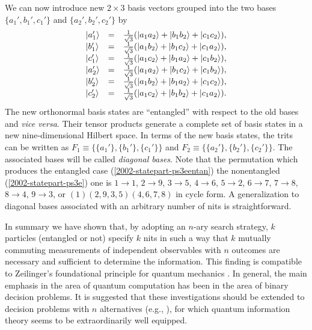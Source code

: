 We can now introduce new $2\times 3$  basis vectors  grouped into the two bases
$\{a_1',b_1',c_1'\}$
and
$\{a_2',b_2',c_2'\}$ by
\begin{equation}
\begin{array}{llll}
\vert a_1'  \rangle &=&{1\over \sqrt{3}}
   (\vert a_1a_2\rangle +  \vert b_1b_2\rangle  + \vert c_1c_2\rangle )
,\\
\vert b_1'  \rangle &=&{1\over \sqrt{3}}
   (\vert a_1b_2\rangle +  \vert b_1c_2\rangle  + \vert c_1a_2\rangle )
,\\
\vert c_1'  \rangle &=&{1\over \sqrt{3}}
   (\vert a_1c_2\rangle +  \vert b_1a_2\rangle  + \vert c_1b_2\rangle )
,\\
\vert a_2'  \rangle &=&{1\over \sqrt{3}}
   (\vert a_1a_2\rangle +  \vert b_1c_2\rangle  + \vert c_1b_2\rangle )
,\\
\vert b_2'  \rangle &=&{1\over \sqrt{3}}
   (\vert a_1b_2\rangle +  \vert b_1a_2\rangle  + \vert c_1c_2\rangle )
,\\
\vert c_2'  \rangle &=&{1\over \sqrt{3}}
   (\vert a_1c_2\rangle +  \vert b_1b_2\rangle  + \vert c_1a_2\rangle )
.
\end{array}
\label{2002-statepart-notb}
\end{equation}
The new orthonormal basis states are ``entangled'' with respect to the old bases
and {\em vice versa}.
Their tensor products generate a complete set of basis states in a new
nine-dimensional Hilbert space.
In terms of the new basis states, the trits can be written as
$F_1\equiv \{\{a_1'\},\{b_1'\},\{c_1'\}\}$
and
$F_2\equiv \{\{a_2'\},\{b_2'\},\{c_2'\}\}$.
The associated bases will be called {\em diagonal bases}.
Note that the permutation which produces the entangled case
(\ref{2002-statepart-ps3eentan})
the nonentangled
(\ref{2002-statepart-ps3e})
one is
$1\rightarrow 1$,
$2\rightarrow 9$,
$3\rightarrow 5$,
$4\rightarrow 6$,
$5\rightarrow 2$,
$6\rightarrow 7$,
$7\rightarrow 8$,
$8\rightarrow 4$,
$9\rightarrow 3$, or $(1)(2,9,3,5)(4,6,7,8)$ in cycle form.
A generalization to diagonal bases associated with
an arbitrary number of nits is straightforward.


In summary we have shown that, by adopting an $n$-ary search strategy,
$k$ particles (entangled or not) specify $k$ nits in such a way that $k$ mutually commuting
measurements of independent observables with $n$ outcomes
are necessary and sufficient to determine the information.
This finding is compatible to Zeilinger's foundational principle for quantum mechanics
\cite{zeil-99}.
In general, the main emphasis in the area of quantum computation
has been in the area of binary decision problems.
It is suggested that these investigations should be extended to
decision problems with $n$ alternatives (e.g., \cite[pp. 332-340]{kleene-52}),
for which quantum information theory seems
to be extraordinarily well equipped.


